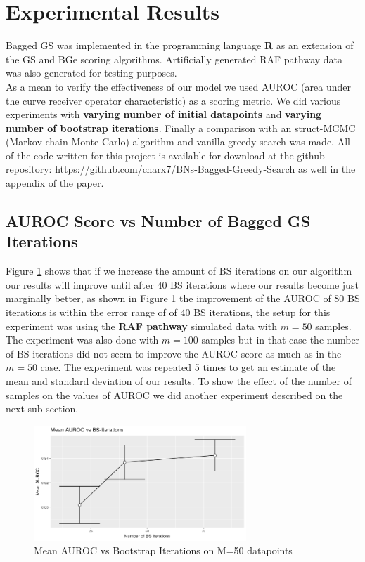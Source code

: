 \documentclass{article}
\begin{document}
	\section{Experimental Results}
	Bagged GS was implemented in the programming language \textbf{R} as an
	extension of the GS and BGe scoring algorithms. Artificially generated RAF
	pathway data was also generated for testing purposes. \\
	As a mean to verify the effectiveness of our model we used
	AUROC (area under the curve receiver operator characteristic) as a scoring
	metric. We did various experiments with \textbf{varying number of initial
	datapoints} and \textbf{varying number of bootstrap iterations}. Finally a
	comparison with an struct-MCMC (Markov chain Monte Carlo)  algorithm and
	vanilla greedy search was made. All of the code written for this project is available for download at
	the github repository: \url{https://github.com/charx7/BNs-Bagged-Greedy-Search} as well in the appendix of the paper.
	\subsection{AUROC Score vs Number of Bagged GS Iterations}
	Figure \ref{fig:aurocBsIterations} shows that if we increase the amount of BS iterations on our
	algorithm our results will improve until after 40 BS iterations where our
	results become just marginally better, as shown in
	Figure \ref{fig:aurocBsIterations} the improvement of the AUROC of 80 BS
	iterations is within the error range of of 40 BS
	iterations, the setup for this experiment was using
	the \textbf{RAF pathway} simulated data with $m=50$ samples. The experiment
	was also done with $m=100$ samples but in that case the number of BS
	iterations did not seem to improve the AUROC score as much as in the
	$m=50$ case. The experiment was repeated 5 times to get an estimate of the
	mean and standard deviation of our results. To show the effect of the number of samples on the values of
	AUROC we did another experiment described on the next sub-section.
	\begin{figure}[ht]
		\includegraphics[width=8cm]{meanAUROCvsBSIterations}
		\centering
		\caption{Mean AUROC vs Bootstrap Iterations on M=50 datapoints}
		\label{fig:aurocBsIterations}
	\end{figure}
\end{document}
